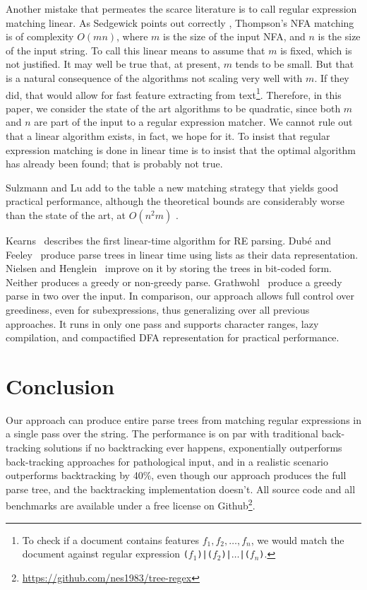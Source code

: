 \documentclass[11pt]{Thesis}
\theoremstyle{definition}
\begin{document}
Another mistake that permeates the scarce literature is to call
regular expression matching linear. As Sedgewick points out correctly
\cite{Sedg90a}, Thompson's NFA matching is of complexity $O(mn)$,
where $m$ is the size of the input NFA, and $n$ is the size of the
input string. To call this linear means to assume that $m$ is fixed,
which is not justified. It may well be true that, at present, $m$
tends to be small. But that is a natural consequence of the algorithms
not scaling very well with $m$. If they did, that would allow for
fast feature extracting from text\footnote{To check if a document
contains features $f_1, f_2, \dots, f_n$, we would match the document
against regular expression \texttt{($f_1$)|($f_2$)|$\dots$|($f_n$)}.}.
Therefore, in this paper, we consider the state of the art algorithms
to be quadratic, since both $m$ and $n$ are part of the input to a
regular expression matcher. We cannot rule out that a linear algorithm
exists, in fact, we hope for it.  To insist that regular expression
matching is done in linear time is to insist that the optimal
algorithm has already been found; that is probably not true.

Sulzmann and Lu add to the table a new matching strategy that yields
good practical performance, although the theoretical bounds are considerably
worse than the state of the art, at $O(n^{2}m)$ \cite{Sulz12a}.

Kearns~\cite{Kear91a} describes the first linear-time algorithm for RE parsing.
Dub\'e and Feeley~\cite{Dube00a} produce parse trees in linear time using lists
as their data representation. Nielsen and Henglein~\cite{Niel11a} improve on it
by storing the trees in bit-coded form.  Neither produces a greedy or
non-greedy parse.  Grathwohl~\cite{Grat13a} produce a greedy parse in two over
the input.  In comparison, our approach allows full control over greediness,
even for subexpressions, thus generalizing over all previous approaches. It
runs in only one pass and supports character ranges, lazy compilation, and
compactified DFA representation for practical performance.

\chapter{Conclusion}
Our approach can produce entire parse trees from matching regular expressions
in a single pass over the string.  The performance is on par with traditional
back-tracking solutions if no backtracking ever happens, exponentially
outperforms back-tracking approaches for pathological input, and in a realistic
scenario outperforms backtracking by 40\%, even though our approach produces
the full parse tree, and the backtracking implementation doesn't. All source
code and all benchmarks are available under a free license on
Github\footnote{\url{https://github.com/nes1983/tree-regex}}.



\end{document}
